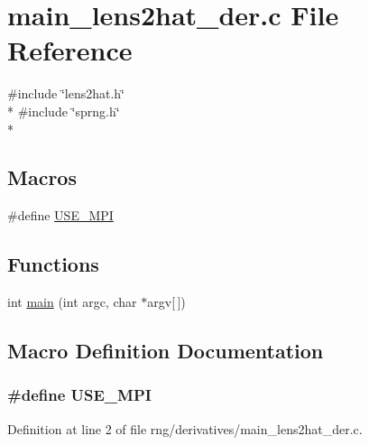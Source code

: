 \section{main\-\_\-lens2hat\-\_\-der.\-c File Reference}
\label{rng_2derivatives_2main__lens2hat__der_8c}
{\ttfamily \#include \char`\"{}lens2hat.\-h\char`\"{}}\\*
{\ttfamily \#include \char`\"{}sprng.\-h\char`\"{}}\\*
\subsection*{Macros}
\begin{DoxyCompactItemize}
\item 
\#define \hyperlink{rng_2derivatives_2main__lens2hat__der_8c_a3869d282031f6ea6b50fdb980b758420}{U\-S\-E\-\_\-\-M\-P\-I}
\end{DoxyCompactItemize}
\subsection*{Functions}
\begin{DoxyCompactItemize}
\item 
int \hyperlink{rng_2derivatives_2main__lens2hat__der_8c_a0ddf1224851353fc92bfbff6f499fa97}{main} (int argc, char $\ast$argv\mbox{[}$\,$\mbox{]})
\end{DoxyCompactItemize}


\subsection{Macro Definition Documentation}
\subsubsection[{U\-S\-E\-\_\-\-M\-P\-I}]{\setlength{\rightskip}{0pt plus 5cm}\#define U\-S\-E\-\_\-\-M\-P\-I}\label{rng_2derivatives_2main__lens2hat__der_8c_a3869d282031f6ea6b50fdb980b758420}


Definition at line 2 of file rng/derivatives/main\-\_\-lens2hat\-\_\-der.\-c.



